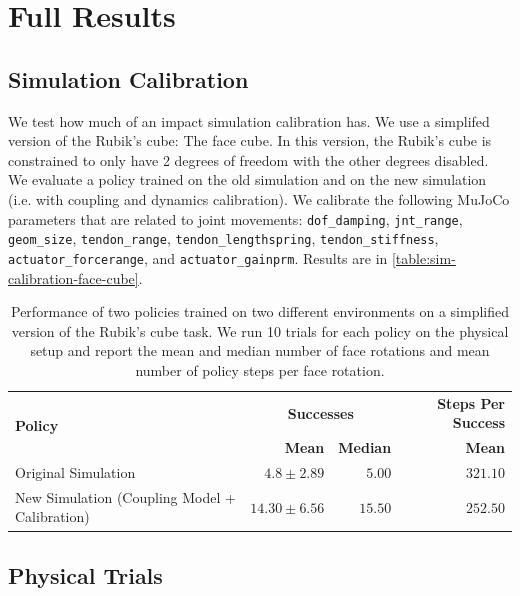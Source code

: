 \section{Full Results}
\label{app:full-results}

\subsection{Simulation Calibration}
\label{app:full-results-sim-calib}

We test how much of an impact simulation calibration has. We use a simplifed version of the Rubik's cube: The face cube. In this version, the Rubik's cube is constrained to only have 2 degrees of freedom with the other degrees disabled. We evaluate a policy trained on the old simulation and on the new simulation (i.e. with coupling and dynamics calibration). We calibrate the following MuJoCo parameters that are related to joint movements: \texttt{dof\_damping}, \texttt{jnt\_range}, \texttt{geom\_size}, \texttt{tendon\_range}, \texttt{tendon\_lengthspring}, \texttt{tendon\_stiffness}, \texttt{actuator\_forcerange}, and \texttt{actuator\_gainprm}. Results are in \autoref{table:sim-calibration-face-cube}.

\begin{table}[h]
    \caption{Performance of two policies trained on two different environments on a simplified version of the Rubik's cube task. We run 10 trials for each policy on the physical setup and report the mean and median number of face rotations and mean number of policy steps per face rotation.}
    \label{table:sim-calibration-face-cube}
    \centering
    \renewcommand{\arraystretch}{1.3}
    \begin{tabular}{@{}lrrr@{}}
        \toprule
        \multirow{2}{*}{\textbf{Policy}} &  \multicolumn{2}{c}{\textbf{Successes}} & \textbf{Steps Per Success} \\
        & \textbf{Mean} & \textbf{Median} & \textbf{Mean} \\
        \midrule
        Original Simulation & $4.8 \pm 2.89$ & $5.00$ & $321.10$ \\
        New Simulation (Coupling Model + Calibration) & $\mathbf{14.30 \pm 6.56}$ & $\mathbf{15.50}$ &  $\mathbf{252.50}$ \\
        \bottomrule
    \end{tabular}
\end{table}

\subsection{Physical Trials}
\label{app:full-results-phy-trials}

